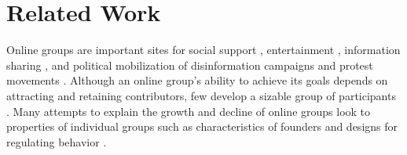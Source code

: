 \documentclass[letterpaper]{article}\usepackage[]{graphicx}\usepackage[]{color}
\begin{document}







\section{Related Work}
\label{sec:related.work}

Online groups are important sites for social support \cite{de_choudhury_mental_2014}, entertainment \cite{ducheneaut_alone_2006}, information sharing \cite{benkler_wealth_2006}, and political mobilization of disinformation campaigns and protest movements \cite{choudhury_social_2016, benkler_social_2013, krafft_disinformation_2020}.
Although an online group's ability to achieve its goals depends on attracting and retaining contributors, few develop a sizable group of participants \cite{kraut_building_2012}. Many attempts to explain the growth and decline of online groups look to properties of individual groups such as characteristics of founders and designs for regulating behavior \cite{kraut_building_2012, halfaker_rise_2013, teblunthuis_revisiting_2018}.
\end{document}
